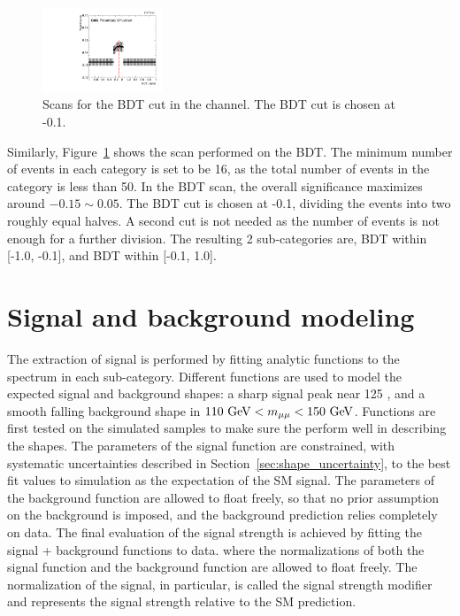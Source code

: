 \begin{figure}[!htb]
  \centering
  \captionsetup{justification=centering}
  \includegraphics[width=0.32\textwidth]{pics/VH_sec/VH_BDT_cats/ZH_BDT_scan.pdf}
  \caption{Scans for the BDT cut in the \ZH channel. The BDT cut is chosen at -0.1.}
  \label{fig:zh_bdt_cat_scan}
\end{figure}

Similarly, Figure~\ref{fig:zh_bdt_cat_scan} shows the scan performed on the \ZH BDT. 
The minimum number of events in each category is set to be 16, 
as the total number of events in the \ZH category is less than 50. 
In the BDT scan, the overall significance maximizes around $-0.15 \sim 0.05$.
The BDT cut is chosen at -0.1, dividing the \ZH events into two roughly equal halves.
A second cut is not needed as the number of events is not enough for a further division.
The resulting 2 \ZH sub-categories are, BDT within [-1.0, -0.1], and BDT within [-0.1, 1.0].


\section{Signal and background modeling}\label{sec:vh_sig_bkg_model}

The extraction of signal is performed by fitting analytic functions to the \mmm spectrum in each sub-category.
Different functions are used to model the expected signal and background shapes: a sharp signal peak near 125 \GeV,
and a smooth falling background shape in $110 ~\mbox{GeV}{} < m_{\mu\mu} < 150 ~\mbox{GeV}{}$.
Functions are first tested on the simulated samples to make sure the perform well in describing the shapes.
The parameters of the signal function are constrained, with systematic uncertainties described in Section~\ref{sec:shape_uncertainty},
to the best fit values to simulation as the expectation of the SM signal.
The parameters of the background function are allowed to float freely, so that no prior assumption on the background is imposed,
and the background prediction relies completely on data.
The final evaluation of the signal strength is achieved by fitting the signal + background functions to data.
where the normalizations of both the signal function and the background function are allowed to float freely.
The normalization of the signal, in particular, is called the signal strength modifier and represents the signal strength relative to the SM prediction.

